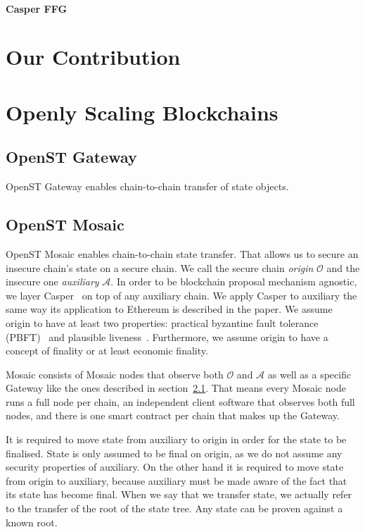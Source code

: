 \documentclass[12pt,a4paper]{article}
\newcommand{\A}{\mathcal{A}}
\newcommand{\OC}{\mathcal{O}}
\begin{document}
\paragraph{Casper FFG}
\cite{casperffg}

%
%
\section{Our Contribution}

%
%
\section{Openly Scaling Blockchains}

\subsection{OpenST Gateway}
\label{subsec:gateway}

OpenST Gateway enables chain-to-chain transfer of state objects.

\subsection{OpenST Mosaic}
\label{subsec:mosaic}
OpenST Mosaic enables chain-to-chain state transfer.
That allows us to secure an insecure chain's state on a secure chain.
We call the secure chain \emph{origin} $\OC$ and the insecure one \emph{auxiliary} $\A$.
In order to be blockchain proposal mechanism agnostic,
we layer Casper~\cite{casperffg} on top of any auxiliary chain.
We apply Casper to auxiliary the same way its application to Ethereum is described in the paper.
We assume origin to have at least two properties:
practical byzantine fault tolerance (PBFT)~\cite{pbft} and plausible liveness~\cite{casperffg}.
Furthermore, we assume origin to have a concept of finality or at least economic finality.

Mosaic consists of Mosaic nodes that observe both $\OC$ and $\A$
as well as a specific Gateway like the ones described in section~\ref{subsec:gateway}.
That means every Mosaic node runs a full node per chain,
an independent client software that observes both full nodes,
and there is one smart contract per chain that makes up the Gateway.

It is required to move state from auxiliary to origin in order for the state to be finalised.
State is only assumed to be final on origin,
as we do not assume any security properties of auxiliary.
On the other hand it is required to move state from origin to auxiliary,
because auxiliary must be made aware of the fact that its state has become final.
When we say that we transfer state,
we actually refer to the transfer of the root of the state tree.
Any state can be proven against a known root.
\end{document}
